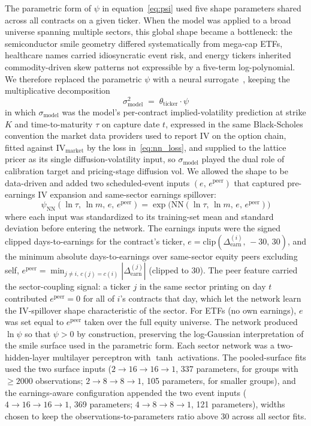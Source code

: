 The parametric form of $\psi$ in equation~\eqref{eq:psi} used five shape parameters shared across all contracts on a given ticker. When the model was applied to a broad universe spanning multiple sectors, this global shape became a bottleneck: the semiconductor smile geometry differed systematically from mega-cap ETFs, healthcare names carried idiosyncratic event risk, and energy tickers inherited commodity-driven skew patterns not expressible by a five-term log-polynomial. We therefore replaced the parametric $\psi$ with a neural surrogate~\cite{horvath2021}, keeping the multiplicative decomposition
\begin{equation}\label{eq:sigma_model}
    \sigma_{\text{model}}^2 \;=\; \theta_{\text{ticker}} \cdot \psi
\end{equation}
in which $\sigma_{\text{model}}$ was the model's per-contract implied-volatility prediction at strike $K$ and time-to-maturity $\tau$ on capture date $t$, expressed in the same Black-Scholes convention the market data providers used to report IV on the option chain, fitted against $\text{IV}_{\text{market}}$ by the loss in~\eqref{eq:nn_loss}, and supplied to the lattice pricer as its single diffusion-volatility input, so $\sigma_{\text{model}}$ played the dual role of calibration target and pricing-stage diffusion vol. We allowed the shape to be data-driven and added two scheduled-event inputs $(e,\,e^{\text{peer}})$ that captured pre-earnings IV expansion and same-sector earnings spillover:
\begin{equation}\label{eq:psi_nn}
    \psi_{\text{NN}}(\ln\tau,\,\ln m,\,e,\,e^{\text{peer}}) = \exp\!\bigl(\mathrm{NN}(\ln\tau,\,\ln m,\,e,\,e^{\text{peer}})\bigr)
\end{equation}
where each input was standardized to its training-set mean and standard deviation before entering the network. The earnings inputs were the signed clipped days-to-earnings for the contract's ticker, $e = \mathrm{clip}(\Delta_{\text{earn}}^{(i)},\,-30,\,30)$, and the minimum absolute days-to-earnings over same-sector equity peers excluding self, $e^{\text{peer}} = \min_{j \neq i,\, c(j)=c(i)} |\Delta_{\text{earn}}^{(j)}|$ (clipped to 30). The peer feature carried the sector-coupling signal: a ticker $j$ in the same sector printing on day $t$ contributed $e^{\text{peer}} = 0$ for all of $i$'s contracts that day, which let the network learn the IV-spillover shape characteristic of the sector. For ETFs (no own earnings), $e$ was set equal to $e^{\text{peer}}$ taken over the full equity universe. The network produced $\ln\psi$ so that $\psi > 0$ by construction, preserving the log-Gaussian interpretation of the smile surface used in the parametric form. Each sector network was a two-hidden-layer multilayer perceptron with $\tanh$ activations. The pooled-surface fits used the two surface inputs ($2 \to 16 \to 16 \to 1$, 337 parameters, for groups with $\geq 2000$ observations; $2 \to 8 \to 8 \to 1$, 105 parameters, for smaller groups), and the earnings-aware configuration appended the two event inputs ($4 \to 16 \to 16 \to 1$, 369 parameters; $4 \to 8 \to 8 \to 1$, 121 parameters), widths chosen to keep the observations-to-parameters ratio above 30 across all sector fits.

